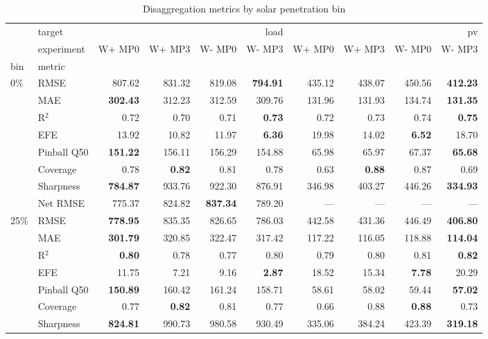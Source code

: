\begin{table}[htbp]
\caption{Disaggregation metrics by solar penetration bin}
\label{tab:disagg_metrics}
\begin{tabular}{llrrrrrrrr}
\toprule
 & target & \multicolumn{4}{r}{load} & \multicolumn{4}{r}{pv} \\
 & experiment & W+ MP0 & W+ MP3 & W- MP0 & W- MP3 & W+ MP0 & W+ MP3 & W- MP0 & W- MP3 \\
bin & metric &  &  &  &  &  &  &  &  \\
\midrule
\multirow[c]{8}{*}{0\%} & RMSE & 807.62 & 831.32 & 819.08 & \bfseries 794.91 & 435.12 & 438.07 & 450.56 & \bfseries 412.23 \\
 & MAE & \bfseries 302.43 & 312.23 & 312.59 & 309.76 & 131.96 & 131.93 & 134.74 & \bfseries 131.35 \\
 & R$^2$ & 0.72 & 0.70 & 0.71 & \bfseries 0.73 & 0.72 & 0.73 & 0.74 & \bfseries 0.75 \\
 & EFE & 13.92 & 10.82 & 11.97 & \bfseries 6.36 & 19.98 & 14.02 & \bfseries 6.52 & 18.70 \\
 & Pinball Q50 & \bfseries 151.22 & 156.11 & 156.29 & 154.88 & 65.98 & 65.97 & 67.37 & \bfseries 65.68 \\
 & Coverage & 0.78 & \bfseries 0.82 & 0.81 & 0.78 & 0.63 & \bfseries 0.88 & 0.87 & 0.69 \\
 & Sharpness & \bfseries 784.87 & 933.76 & 922.30 & 876.91 & 346.98 & 403.27 & 446.26 & \bfseries 334.93 \\
 & Net RMSE & 775.37 & 824.82 & \bfseries 837.34 & 789.20 & --- & --- & --- & --- \\
\midrule
\multirow[c]{8}{*}{25\%} & RMSE & \bfseries 778.95 & 835.35 & 826.65 & 786.03 & 442.58 & 431.36 & 446.49 & \bfseries 406.80 \\
 & MAE & \bfseries 301.79 & 320.85 & 322.47 & 317.42 & 117.22 & 116.05 & 118.88 & \bfseries 114.04 \\
 & R$^2$ & \bfseries 0.80 & 0.78 & 0.77 & 0.80 & 0.79 & 0.80 & 0.81 & \bfseries 0.82 \\
 & EFE & 11.75 & 7.21 & 9.16 & \bfseries 2.87 & 18.52 & 15.34 & \bfseries 7.78 & 20.29 \\
 & Pinball Q50 & \bfseries 150.89 & 160.42 & 161.24 & 158.71 & 58.61 & 58.02 & 59.44 & \bfseries 57.02 \\
 & Coverage & 0.77 & \bfseries 0.82 & 0.81 & 0.77 & 0.66 & 0.88 & \bfseries 0.88 & 0.73 \\
 & Sharpness & \bfseries 824.81 & 990.73 & 980.58 & 930.49 & 335.06 & 384.24 & 423.39 & \bfseries 319.18 \\

\end{tabular}
\end{table}
